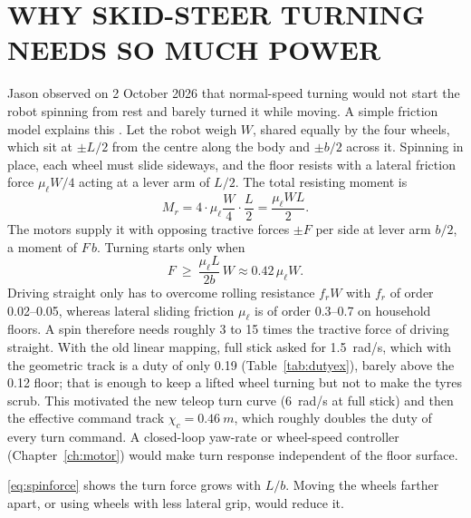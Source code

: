 \section{WHY SKID-STEER TURNING NEEDS SO MUCH POWER}
\label{sec:skidturn}

Jason observed on 2 October 2026 that normal-speed turning would not start the
robot spinning from rest and barely turned it while moving. A simple
friction model explains this \cite{wong2008theory}. Let the robot weigh $W$,
shared equally by the four wheels, which sit at $\pm L/2$ from the centre
along the body and $\pm b/2$ across it. Spinning in place, each wheel must
slide sideways, and the floor resists with a lateral friction force
$\mu_\ell W/4$ acting at a lever arm of $L/2$. The total resisting moment is
\begin{equation}
M_r = 4\cdot\mu_\ell\frac{W}{4}\cdot\frac{L}{2}=\frac{\mu_\ell W L}{2}.
\end{equation}
The motors supply it with opposing tractive forces $\pm F$ per side at lever
arm $b/2$, a moment of $F\,b$. Turning starts only when
\begin{equation}\label{eq:spinforce}
F \ \ge\ \frac{\mu_\ell L}{2b}\,W \approx 0.42\,\mu_\ell W .
\end{equation}
Driving straight only has to overcome rolling resistance $f_rW$ with $f_r$ of
order 0.02--0.05, whereas lateral sliding friction $\mu_\ell$ is of order 0.3--0.7
on household floors. A spin therefore needs roughly 3 to 15 times the
tractive force of driving straight. With the old linear mapping, full stick
asked for \SI{1.5}{rad/s}, which with the geometric track is a duty of only
0.19 (Table~\ref{tab:dutyex}), barely above the 0.12 floor; that is enough
to keep a lifted wheel turning but not to make the tyres scrub. This
motivated the new teleop turn curve (\SI{6}{rad/s} at full stick) and then
the effective command track $\chi_c=\SI{0.46}{m}$, which roughly doubles the
duty of every turn command. A closed-loop yaw-rate or wheel-speed controller
(Chapter~\ref{ch:motor}) would make turn response independent of the floor
surface.

\begin{remark}
\eqref{eq:spinforce} shows the turn force grows with $L/b$. Moving the
wheels farther apart, or using wheels with less lateral grip, would reduce it.
\end{remark}
